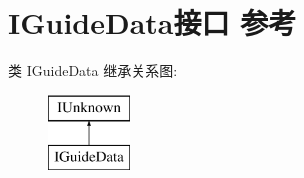 \hypertarget{interface_i_guide_data}{}\section{I\+Guide\+Data接口 参考}
\label{interface_i_guide_data}
类 I\+Guide\+Data 继承关系图\+:\begin{figure}[H]
\begin{center}
\leavevmode
\includegraphics[height=2.000000cm]{interface_i_guide_data}
\end{center}
\end{figure}
